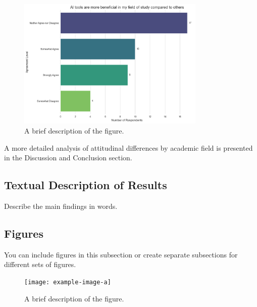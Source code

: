 \documentclass[12pt]{article}
\begin{document}
\begin{figure}[htbp]
  \centering
  \includegraphics[width=0.8\textwidth]{fig7-3.png} %
  \caption{A brief description of the figure.}
  \label{fig:example1}
\end{figure}

A more detailed analysis of attitudinal differences by academic field is presented in the Discussion and Conclusion section.

\subsection{Textual Description of Results}
Describe the main findings in words.

\subsection{Figures}
\label{subsec:figures}
You can include figures in this subsection or create separate subsections for different sets of figures.

\begin{figure}[htbp]
  \centering
  \texttt{[image: example-image-a]} %
  \caption{A brief description of the figure.}
  \label{fig:example1}
\end{figure}
\end{document}
